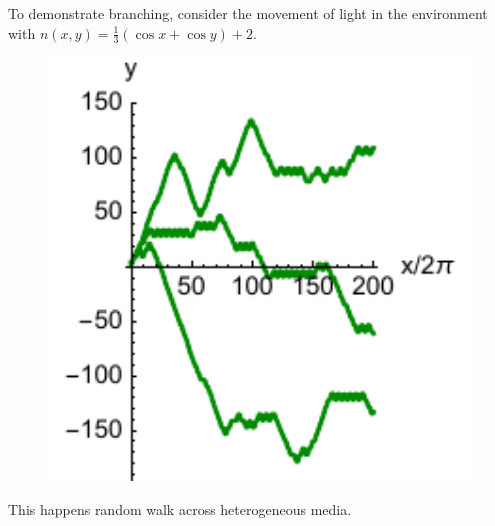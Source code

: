 To demonstrate branching, consider the movement of light in the environment with 
$n(x, y) = \textstyle\frac{1}{3}\left(\cos x +\cos y \right) + 2$.


\begin{minipage}{0.6\textwidth}
      \begin{figure}[h]
    \end{figure}
\end{minipage}
\hfill
\begin{minipage}{0.35\textwidth}
    \begin{figure}[h]
        \centering
        \includegraphics[width=1.0\textwidth]{figures/rnd_walk.pdf}
    \end{figure}

     \phantom{42}
\end{minipage}

This happens random walk across heterogeneous media.